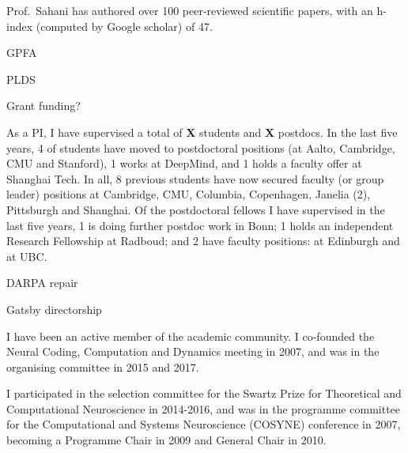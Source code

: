 Prof.\ Sahani has authored over 100 peer-reviewed scientific papers,
with an h-index (computed by Google scholar) of 47.

GPFA

PLDS

Grant funding?


As a PI, I have supervised a total of \textbf{X} students and \textbf{X} postdocs.  
In the last five years, 4 of students have moved to postdoctoral positions (at
Aalto, Cambridge, CMU and Stanford), 1 works at DeepMind, and 1 holds a faculty offer at Shanghai Tech.  In all, 8 previous students have now secured faculty (or group leader) positions at Cambridge, CMU, Columbia, Copenhagen, Janelia (2), Pittsburgh and Shanghai.
%
Of the postdoctoral fellows I have supervised in the last five years, 1 is doing further postdoc work in Bonn; 1 holds an independent
Research Fellowship at Radboud; and 2 have faculty positions: at Edinburgh and at UBC.

DARPA repair

Gatsby directorship
 


% 

I have been an active member of the academic community. I co-founded the Neural Coding, Computation and Dynamics meeting in 2007, and was in the organising committee in 2015 and 2017. 

I participated in the selection committee for the Swartz Prize for Theoretical and Computational Neuroscience in 2014-2016, and was in the programme committee for the Computational and Systems Neuroscience (COSYNE) conference in 2007, becoming a  Programme Chair in 2009 and General Chair in 2010. 

